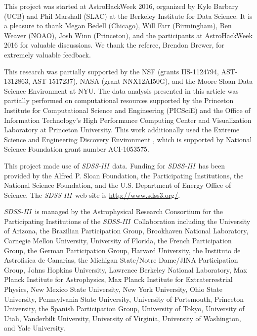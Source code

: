 \documentclass[manuscript, letterpaper]{aastex6}
\newcommand{\project}[1]{\textsl{#1}}
\newcommand{\acronym}[1]{{\small{#1}}}
\newcommand{\sdssiii}{\project{\acronym{SDSS-III}}}
\begin{document}
\acknowledgements
This project was started at AstroHackWeek 2016, organized by Kyle
Barbary (UCB) and Phil Marshall (SLAC) at the Berkeley Institute for
Data Science.
It is a pleasure to thank
  Megan Bedell (Chicago),
  Will Farr (Birmingham),
  Ben Weaver (NOAO),
  Josh Winn (Princeton),
  and the participants at AstroHackWeek 2016
for valuable discussions.
We thank the referee, Brendon Brewer, for extremely valuable feedback.

This research was partially supported by
  the \acronym{NSF} (grants \acronym{IIS-1124794}, \acronym{AST-1312863}, \acronym{AST-1517237}),
  \acronym{NASA} (grant \acronym{NNX12AI50G}),
  and the Moore-Sloan Data Science Environment at \acronym{NYU}.
The data analysis presented in this article was partially performed on
computational resources supported by the Princeton Institute for Computational
Science and Engineering (PICSciE) and the Office of Information Technology's
High Performance Computing Center and Visualization Laboratory at Princeton
University.
This work additionally used the Extreme Science and Engineering Discovery
Environment \citep[XSEDE;][]{Towns:2014}, which is supported by National
Science Foundation grant number ACI-1053575.

This project made use of \sdssiii\ data. Funding for \sdssiii\ has been
provided by the Alfred P. Sloan Foundation, the Participating Institutions, the
National Science Foundation, and the \acronym{U.S.} Department of Energy Office
of Science. The \sdssiii\ web site is \url{http://www.sdss3.org/}.

\sdssiii\ is managed by the Astrophysical Research Consortium for the
Participating Institutions of the \sdssiii\ Collaboration including the
University of Arizona, the Brazilian Participation Group, Brookhaven National
Laboratory, Carnegie Mellon University, University of Florida, the French
Participation Group, the German Participation Group, Harvard University, the
Instituto de Astrofisica de Canarias, the Michigan State/Notre
Dame/\acronym{JINA} Participation Group, Johns Hopkins University, Lawrence
Berkeley National Laboratory, Max Planck Institute for Astrophysics, Max Planck
Institute for Extraterrestrial Physics, New Mexico State University, New York
University, Ohio State University, Pennsylvania State University, University of
Portsmouth, Princeton University, the Spanish Participation Group, University
of Tokyo, University of Utah, Vanderbilt University, University of Virginia,
University of Washington, and Yale University.
\end{document}
